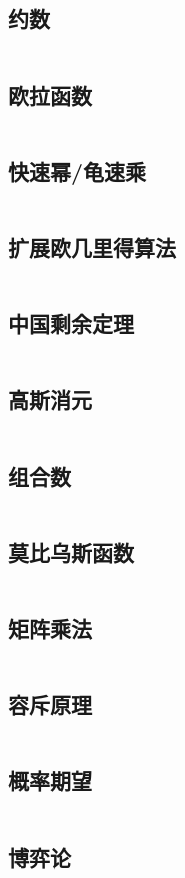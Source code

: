 \documentclass[a4paper,12pt]{article}
\begin{document}
\subsection{约数}
\inputminted[breaklines]{c++}{math/yueshu.cc}
\subsection{欧拉函数}
\inputminted[breaklines]{c++}{math/eluer.cc}
\subsection{快速幂/龟速乘}
\inputminted[breaklines]{c++}{math/qmi.cc}
\subsection{扩展欧几里得算法}
\inputminted[breaklines]{c++}{math/exgcd.cc}
\subsection{中国剩余定理}
\inputminted[breaklines]{c++}{math/crt.cc}
\subsection{高斯消元}
\inputminted[breaklines]{c++}{math/gauss.cc}
\subsection{组合数}
\inputminted[breaklines]{c++}{math/combine.cc}
\subsection{莫比乌斯函数}
\inputminted[breaklines]{c++}{math/mobius.cc}
\subsection{矩阵乘法}
\inputminted[breaklines]{c++}{math/matrix.cc}
\subsection{容斥原理}
\inputminted[breaklines]{c++}{math/rongchi.cc}
\subsection{概率期望}
\inputminted[breaklines]{c++}{math/qiwang.cc}
\subsection{博弈论}
\inputminted[breaklines]{c++}{math/game.cc}
\end{document}
